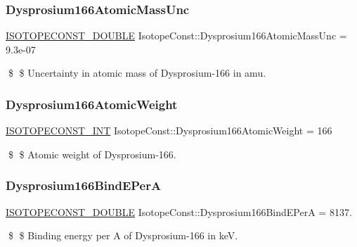 \subsubsection{\texorpdfstring{Dysprosium166\+Atomic\+Mass\+Unc}{Dysprosium166AtomicMassUnc}}
{\footnotesize\ttfamily \mbox{\hyperlink{group___isotope_const-_macros_ga8f45a7272ce02c0b4c65c44636ed719a}{I\+S\+O\+T\+O\+P\+E\+C\+O\+N\+S\+T\+\_\+\+D\+O\+U\+B\+LE}} Isotope\+Const\+::\+Dysprosium166\+Atomic\+Mass\+Unc = 9.\+3e-\/07}

\$ \$ Uncertainty in atomic mass of Dysprosium-\/166 in amu. \mbox{\label{group___isotope_const-_dysprosium-_dy166_gaef6f4112f4252069fc16bd16e4e14b8f}} 
\subsubsection{\texorpdfstring{Dysprosium166\+Atomic\+Weight}{Dysprosium166AtomicWeight}}
{\footnotesize\ttfamily \mbox{\hyperlink{group___isotope_const-_macros_ga5f18360b3e99483a35c32d789e62621c}{I\+S\+O\+T\+O\+P\+E\+C\+O\+N\+S\+T\+\_\+\+I\+NT}} Isotope\+Const\+::\+Dysprosium166\+Atomic\+Weight = 166}

\$ \$ Atomic weight of Dysprosium-\/166. \mbox{\label{group___isotope_const-_dysprosium-_dy166_ga3f26a2499c505a4ac21298f8c3a7aad7}} 
\subsubsection{\texorpdfstring{Dysprosium166\+Bind\+E\+PerA}{Dysprosium166BindEPerA}}
{\footnotesize\ttfamily \mbox{\hyperlink{group___isotope_const-_macros_ga8f45a7272ce02c0b4c65c44636ed719a}{I\+S\+O\+T\+O\+P\+E\+C\+O\+N\+S\+T\+\_\+\+D\+O\+U\+B\+LE}} Isotope\+Const\+::\+Dysprosium166\+Bind\+E\+PerA = 8137.}

\$ \$ Binding energy per A of Dysprosium-\/166 in keV. \mbox{\label{group___isotope_const-_dysprosium-_dy166_gac83dd3492dd5cd1e52c6bc79efdb2b0d}} 
